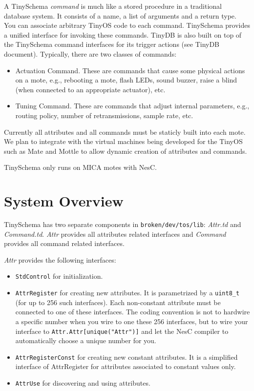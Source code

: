 \documentclass[11pt]{article}
\newcommand{\docroot}{broken/dev}
\begin{document}
A TinySchema {\em command} is much like a stored procedure in a traditional
database system.  It consists of a name, a list of arguments and a return
type.  You can associate arbitrary TinyOS code to each command.
TinySchema provides a unified interface for invoking these commands.
TinyDB is also built on top of the TinySchema command interfaces for
its trigger actions (see TinyDB document).  Typically, there are two
classes of commands:
\begin{itemize}
\item Actuation Command.  These are commands that cause some physical
actions on a mote, e.g., rebooting a mote, flash LEDs, sound buzzer,
raise a blind (when connected to an appropriate actuator), etc.
\item Tuning Command.  These are commands that adjust internal parameters,
e.g., routing policy, number of retransmissions, sample rate, etc.
\end{itemize}

Currently all attributes and all commands must be staticly built
into each mote.  We plan to integrate with the virtual machines being
developed for the TinyOS such as Mate and Mottle to allow dynamic
creation of attributes and commands.

TinySchema only runs on MICA motes with NesC.

\section{System Overview}

TinySchema has two separate components in {\tt \docroot/tos/lib}:
{\em Attr.td} and {\em Command.td}.  {\em Attr} provides all attributes
related interfaces and {\em Command} provides all command related interfaces.

{\em Attr} provides the following interfaces:
\begin{itemize}
\item {\tt StdControl} for initialization.
\item {\tt AttrRegister} for creating new attributes.  It is parametrized
by a {\tt uint8\_t} (for up to 256 such interfaces).  Each non-constant attribute must be
connected to one of these interfaces.  The coding convention is not
to hardwire a specific number when you wire to one these 256 interfaces, but
to wire your interface to {\tt Attr.Attr[unique("Attr")]} and let
the NesC compiler to automatically choose a unique number for you.
\item {\tt AttrRegisterConst} for creating new constant attributes.  It is a
simplified interface of AttrRegister for attributes associated to 
constant values only.
\item {\tt AttrUse} for discovering and using attributes.
\end{itemize}
\end{document}
